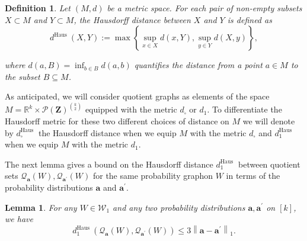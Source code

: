 \documentclass[11pt]{article}
\newtheorem{lemma}[theorem]{Lemma}
\newtheorem{definition}[theorem]{Definition}
\def\R{\mathbb{R}}
\newcommand{\cP}{{\mathcal P}}  %
\newcommand{\Space}{\mathbf{Z}}
\begin{document}
\begin{definition}\label{DefHausdorffDist}
Let $(M, d)$ be a metric space. For each pair of non-empty subsets $X \subset M$ and $Y \subset M$, the \emph{Hausdorff distance} between $X$ and $Y$ is defined as
$$
d^{\text {Haus }}(X, Y):=\max \left\{\sup _{x \in X} d(x, Y), \sup _{y \in Y} d(X, y)\right\},
$$

 where $d(a, B)=\inf _{b \in B} d(a, b)$ quantifies the distance from a point $a \in M$ to the subset $B \subseteq M$.
\end{definition}

As anticipated, we will consider quotient graphs as elements of the space $M=\R^k\times\cP(\Space)^{{k} \choose {2}}$ equipped with the metric $d_{\square}$ or $d_1.$ To differentiate the Hausdorff metric for these two different choices of distance on $M$ we will denote by $d_{\square}^{\text {Haus }}$ the Hausdorff distance when we equip $M$ with the metric $d_{\square}$ and $d^{\text {Haus }}_1$ when we equip $M$ with the metric $d_{1}.$  

The next lemma gives a bound on the Hausdorff distance $d_1^{\text {Haus }}$ between quotient sets  $\mathcal{Q}_{\mathbf{a}}(W), \mathcal{Q}_{\mathbf{a}^{\prime}}(W)$ for the same probability graphon $W$ in terms of the probability distributions $\mathbf{a}$ and $\mathbf{a}^{\prime}.$

\begin{lemma}\label{LemmaBoundQuotients3L1}
For any $W \in \mathcal{W}_1$ and any two probability distributions  $\mathbf{a},\mathbf{a }^{\prime}$ on $[k]$, we have $$d_1^{\text {Haus }}\left(\mathcal{Q}_{\mathbf{a}}(W), \mathcal{Q}_{\mathbf{a}^{\prime}}(W)\right) \leq 3\left\|\mathbf{a}-\mathbf{a}^{\prime}\right\|_1.$$
\end{lemma} 
\end{document}

